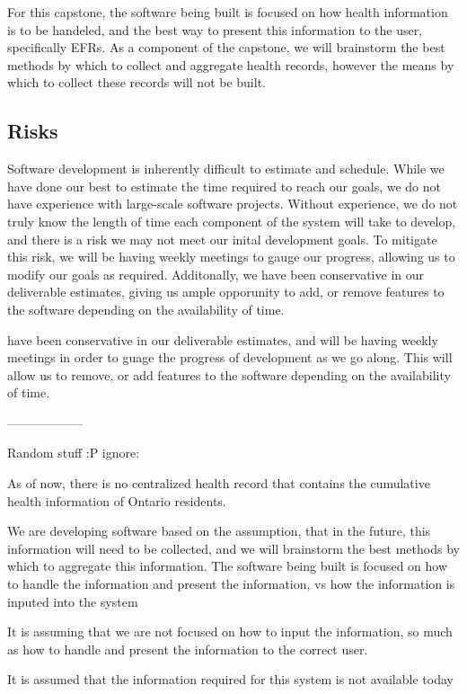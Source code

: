 \documentclass{article}
\begin{document}
For this capstone, the software being built is focused on how health information is to be handeled, and the best way to present this information to the user, specifically EFRs. As a component of the capstone, we will brainstorm the best methods by which to collect and aggregate health records, however the means by which to collect these records will not be built.

\subsection{Risks}

Software development is inherently difficult to estimate and schedule. While we have done our best to estimate the time required to reach our goals, we do not have experience with large-scale software projects. Without experience, we do not truly know the length of time each component of the system will take to develop, and there is a risk we may not meet our inital development goals. To mitigate this risk, we will be having weekly meetings to gauge our progress, allowing us to modify our goals as required. Additonally, we have been conservative in our deliverable estimates, giving us ample opporunity to add, or remove features to the software depending on the availability of time.

\iffalse
have been conservative in our deliverable estimates, and will be having weekly meetings in order to guage the progress of development as we go along. This will allow us to remove, or add features to the software depending on the availability of time.




------------------

Random stuff :P ignore:

As of now, there is no centralized health record that contains the cumulative health information of Ontario residents.

We are developing software based on the assumption, that in the future, this information will need to be collected, and we will brainstorm the best methods by which to aggregate this information. The software being built is focused on how to handle the information and present the information, vs how the information is inputed into the system

It is assuming that we are not focused on how to input the information, so much as how to handle and present the information to the correct user.

It is assumed that the information required for this system is not available today
\end{document}
